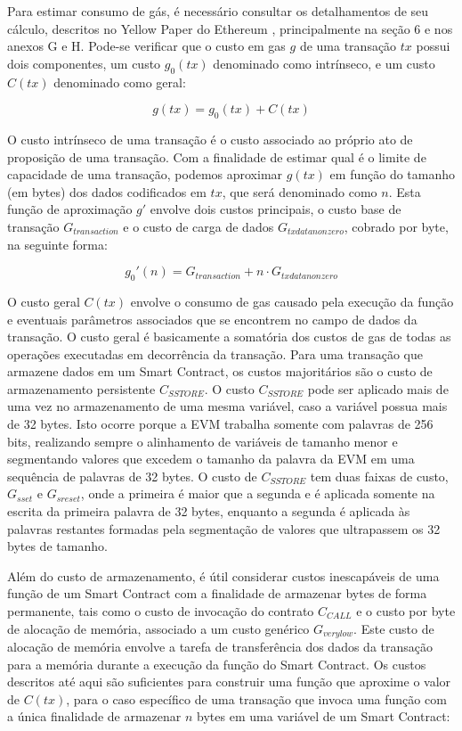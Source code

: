 \documentclass[a4paper,11pt]{article}
\begin{document}
Para estimar consumo de gás, é necessário consultar os detalhamentos de seu cálculo, descritos no Yellow Paper do Ethereum \cite{Wood2017}, principalmente na seção 6 e nos anexos G e H.
Pode-se verificar que o custo em gas $g$ de uma transação $tx$ possui dois componentes, um custo $g_{0}(tx)$ denominado como intrínseco, e um custo $C(tx)$ denominado como geral:

\[ g(tx) = g_{0}(tx) + C(tx) \]

O custo intrínseco de uma transação é o custo associado ao próprio ato de proposição de uma transação.
Com a finalidade de estimar qual é o limite de capacidade de uma transação, podemos aproximar $g(tx)$ em função do tamanho (em bytes) dos dados codificados em $tx$, que será denominado como $n$.
Esta função de aproximação $g'$ envolve dois custos principais, o custo base de transação $G_{transaction}$ e o custo de carga de dados $G_{txdatanonzero}$, cobrado por byte, na seguinte forma:

\[ g_{0}'(n) = G_{transaction} + n \cdot G_{txdatanonzero} \]

O custo geral $C(tx)$ envolve o consumo de gas causado pela execução da função e eventuais parâmetros associados que se encontrem no campo de dados da transação.
O custo geral é basicamente a somatória dos custos de gas de todas as operações executadas em decorrência da transação.
Para uma transação que armazene dados em um Smart Contract, os custos majoritários são o custo de armazenamento
persistente $C_{SSTORE}$.
O custo $C_{SSTORE}$ pode ser aplicado mais de uma vez no armazenamento de uma mesma variável, caso a variável possua mais de 32 bytes.
Isto ocorre porque a EVM trabalha somente com palavras de 256 bits, realizando sempre o alinhamento de variáveis de tamanho menor e segmentando valores que excedem o tamanho da palavra da EVM em uma sequência de palavras de 32 bytes.
O custo de $C_{SSTORE}$ tem duas faixas de custo, $G_{sset}$ e $G_{sreset}$, onde a primeira é maior que a segunda e é aplicada somente na escrita da primeira palavra de 32 bytes, enquanto a segunda é aplicada às palavras restantes formadas pela segmentação de valores que ultrapassem os 32 bytes de tamanho.

Além do custo de armazenamento, é útil considerar custos inescapáveis de uma função de um Smart Contract com a finalidade de armazenar bytes de forma permanente, tais como o custo de invocação do contrato $C_{CALL}$ e o custo por byte de alocação de memória, associado a um custo genérico $G_{verylow}$.
Este custo de alocação de memória envolve a tarefa de transferência dos dados da transação para a memória durante a execução da função do Smart Contract.
Os custos descritos até aqui são suficientes para construir uma função que aproxime o valor de $C(tx)$, para o caso específico de uma transação que invoca uma função com a única finalidade de armazenar $n$ bytes em uma variável de um Smart Contract:
\end{document}
